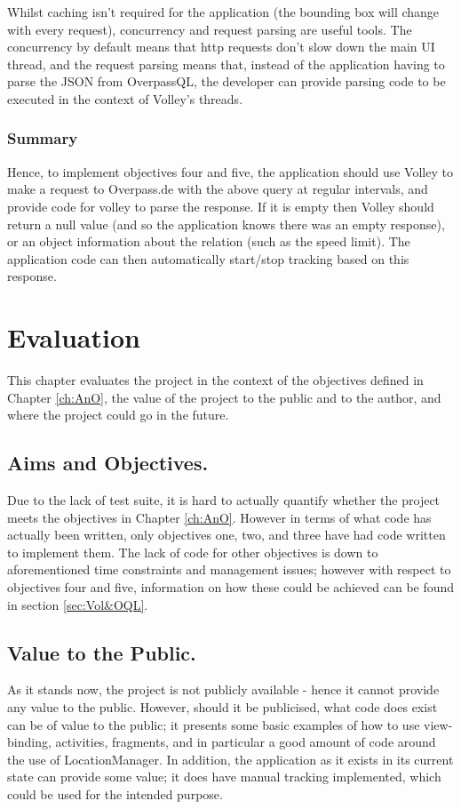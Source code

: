 \documentclass[11pt, a4paper, notitlepage]{report}
\begin{document}
Whilst caching isn't required for the application (the bounding box will change with every request), concurrency and request parsing are useful tools. The concurrency by default means that http requests don't slow down the main UI thread, and the request parsing means that, instead of the application having to parse the JSON from OverpassQL, the developer can provide parsing code to be executed in the context of Volley's threads.

\subsection{Summary}
Hence, to implement objectives four and five, the application should use Volley to make a request to Overpass.de with the above query at regular intervals, and provide code for volley to parse the response. If it is empty then Volley should return a null value (and so the application knows there was an empty response), or an object information about the relation (such as the speed limit). The application code can then automatically start/stop tracking based on this response.

\chapter{Evaluation}
This chapter evaluates the project in the context of the objectives defined in Chapter \ref{ch:AnO}, the value of the project to the public and to the author, and where the project could go in the future.

\section{Aims and Objectives.}
Due to the lack of test suite, it is hard to actually quantify whether the project meets the objectives in Chapter \ref{ch:AnO}. However in terms of what code has actually been written, only objectives one, two, and three have had code written to implement them. The lack of code for other objectives is down to aforementioned time constraints and management issues; however with respect to objectives four and five, information on how these could be achieved can be found in section \ref{sec:Vol&OQL}.

\section{Value to the Public.}
As it stands now, the project is not publicly available - hence it cannot provide any value to the public. However, should it be publicised, what code does exist can be of value to the public; it presents some basic examples of how to use view-binding, activities, fragments, and in particular a good amount of code around the use of LocationManager. In addition, the application as it exists in its current state can provide some value; it does have manual tracking implemented, which could be used for the intended purpose.
\end{document}
